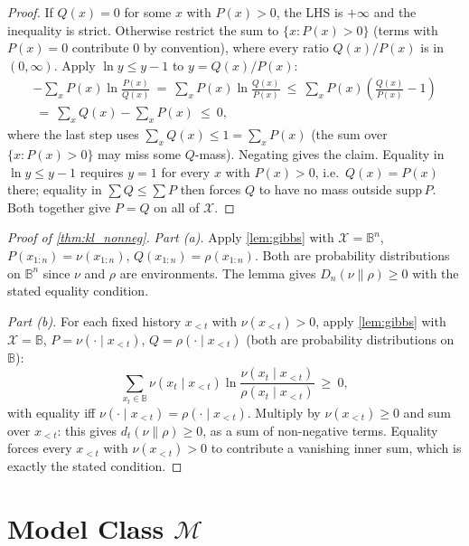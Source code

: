 \documentclass[fontsize=11pt, parskip=half]{scrartcl}
\theoremstyle{definition}
\newcommand{\Mc}{\mathcal{M}}
\begin{document}
\begin{proof}
If $Q(x) = 0$ for some $x$ with $P(x) > 0$, the LHS is $+\infty$ and the inequality is strict. Otherwise restrict the sum to $\{x : P(x) > 0\}$ (terms with $P(x) = 0$ contribute $0$ by convention), where every ratio $Q(x)/P(x)$ is in $(0, \infty)$. Apply $\ln y \leq y - 1$ to $y = Q(x)/P(x)$:
\begin{align*}
  - \sum_x P(x) \ln \frac{P(x)}{Q(x)}
  ~=~ \sum_x P(x) \ln \frac{Q(x)}{P(x)}
  ~\leq~ \sum_x P(x) \left(\frac{Q(x)}{P(x)} - 1\right) \\
  ~=~ \sum_x Q(x) - \sum_x P(x) ~\leq~ 0,
\end{align*}
where the last step uses $\sum_x Q(x) \leq 1 = \sum_x P(x)$ (the sum over $\{x : P(x) > 0\}$ may miss some $Q$-mass). Negating gives the claim. Equality in $\ln y \leq y - 1$ requires $y = 1$ for every $x$ with $P(x) > 0$, i.e.\ $Q(x) = P(x)$ there; equality in $\sum Q \leq \sum P$ then forces $Q$ to have no mass outside $\mathrm{supp}\,P$. Both together give $P = Q$ on all of $\mathcal{X}$.
\end{proof}

\begin{proof}[Proof of \cref{thm:kl_nonneg}]
\textit{Part (a).} Apply \cref{lem:gibbs} with $\mathcal{X} = \mathbb{B}^n$, $P(x_{1:n}) = \nu(x_{1:n})$, $Q(x_{1:n}) = \rho(x_{1:n})$. Both are probability distributions on $\mathbb{B}^n$ since $\nu$ and $\rho$ are environments. The lemma gives $D_n(\nu \parallel \rho) \geq 0$ with the stated equality condition.

\textit{Part (b).} For each fixed history $x_{<t}$ with $\nu(x_{<t}) > 0$, apply \cref{lem:gibbs} with $\mathcal{X} = \mathbb{B}$, $P = \nu(\cdot \mid x_{<t})$, $Q = \rho(\cdot \mid x_{<t})$ (both are probability distributions on $\mathbb{B}$):
\[
  \sum_{x_t \in \mathbb{B}} \nu(x_t \mid x_{<t}) \ln \frac{\nu(x_t \mid x_{<t})}{\rho(x_t \mid x_{<t})} ~\geq~ 0,
\]
with equality iff $\nu(\cdot \mid x_{<t}) = \rho(\cdot \mid x_{<t})$. Multiply by $\nu(x_{<t}) \geq 0$ and sum over $x_{<t}$: this gives $d_t(\nu \parallel \rho) \geq 0$, as a sum of non-negative terms. Equality forces every $x_{<t}$ with $\nu(x_{<t}) > 0$ to contribute a vanishing inner sum, which is exactly the stated condition.
\end{proof}


\section{Model Class $\Mc$}\label{app:model_class}
\end{document}
